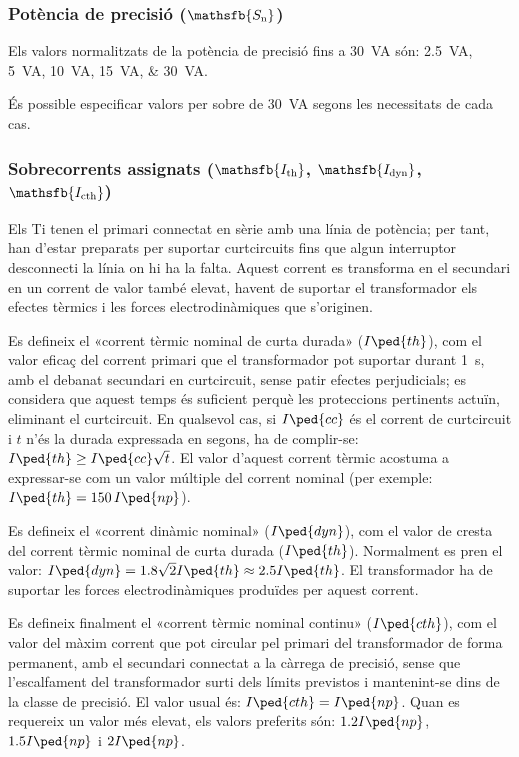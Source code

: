 \subsubsection{Potència de precisió ($\mathsfb{S_\text{n}}$)}

 Els valors normalitzats de la potència de precisió fins a \qty{30}{VA}
són: \qtylist{2,5; 5;10; 15; 30}{VA}.

És possible especificar valors per sobre de \qty{30}{VA} segons les necessitats de cada cas.

\subsubsection{Sobrecorrents  assignats ($\mathsfb{I_\text{th}}$, $\mathsfb{I_\text{dyn}}$, $\mathsfb{I_\text{cth}}$)}

 Els Ti
tenen el primari connectat en sèrie amb una línia de potència; per tant, han
d'estar preparats per suportar curtcircuits fins que algun
interruptor desconnecti la línia on hi ha la falta. Aquest
corrent es transforma en el secundari en un corrent de valor
també elevat, havent de suportar el transformador els efectes tèrmics
i les forces electrodinàmiques que s'originen.

Es defineix el «corrent tèrmic nominal de curta durada»
($I\ped{th}$), com el valor eficaç del  corrent primari que el
transformador pot suportar durant \qty{1}{s}, amb el debanat
secundari en curtcircuit, sense patir efectes perjudicials; es
considera que aquest temps és suficient perquè les proteccions
pertinents actuïn, eliminant el curtcircuit. En qualsevol cas, si
$I\ped{cc}$ és el corrent de curtcircuit i $t$ n'és la durada
 expressada en segons, ha de complir-se: $I\ped{th}\geq
I\ped{cc}\sqrt{t}$. El valor d'aquest corrent tèrmic
acostuma a expressar-se com  un valor múltiple del corrent
nominal (per exemple: $I\ped{th}=150\,I\ped{np}$).

Es defineix el «corrent dinàmic nominal» ($I\ped{dyn}$), com el
valor de cresta del corrent tèrmic nominal de curta durada ($I\ped{th}$).
Normalment es pren el valor: $I\ped{dyn} =
\num{1,8}\sqrt{2}I\ped{th}\approx \num{2,5}I\ped{th}$. El transformador ha de
suportar les forces electrodinàmiques produïdes per aquest corrent.

Es defineix finalment el «corrent tèrmic nominal continu» ($I\ped{cth}$), com
el valor del màxim corrent que pot circular pel primari del
transformador  de forma permanent, amb el secundari connectat a la
càrrega de precisió, sense que l'escalfament del transformador surti
dels límits previstos i mantenint-se dins de la
 classe de precisió. El valor usual és: $I\ped{cth} = I\ped{np}$. Quan es requereix un valor més elevat, els valors preferits són:
$\num{1,2}I\ped{np}$, $\num{1,5}I\ped{np}$ i $2 I\ped{np}$.

